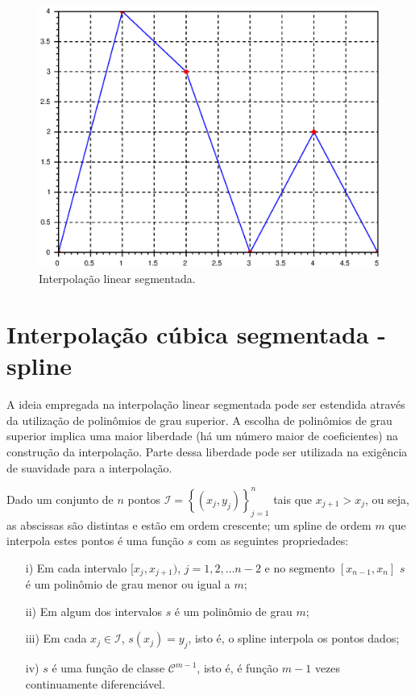 \begin{figure}[htp]
  \begin{center}
    \includegraphics[scale=0.5]{./cap_interp/pics/interpolacao_linear_segmentada.eps}
    \caption{Interpolação linear segmentada.}
    \label{fig:linear_segmentada}
  \end{center}
\end{figure}


\section{Interpolação cúbica segmentada - spline}
A ideia empregada na interpolação linear segmentada pode ser estendida através da utilização de polinômios de grau superior. A escolha de polinômios de grau superior implica uma maior liberdade (há um número maior de coeficientes) na construção da interpolação. Parte dessa liberdade pode ser utilizada na exigência de suavidade para a interpolação.

\begin{defn}Dado um conjunto de $n$ pontos $\mathcal{I}=\left\{(x_j,y_j)\right\}_{j=1}^n$ tais que $x_{j+1}>x_j$, ou seja, as abscissas são distintas e estão em ordem crescente; um spline de ordem $m$ que interpola estes pontos é uma função $s$ com as seguintes propriedades:
\begin{itemize}
\item[i)] Em cada intervalo $[x_j,x_{j+1})$, $j=1,2,\ldots n-2$ e no segmento $[x_{n-1},x_n]$ $s$ é um polinômio de grau menor ou igual a  $m$;
\item[ii)] Em algum dos intervalos $s$ é um polinômio de grau $m$;
\item[iii)] Em cada $x_j\in \mathcal{I}$, $s(x_j)=y_j$, isto é, o spline interpola os pontos dados;
\item[iv)] $s$ é uma função de classe $\mathcal{C}^{m-1}$, isto é, é função $m-1$ vezes continuamente diferenciável.
\end{itemize}
\end{defn}

